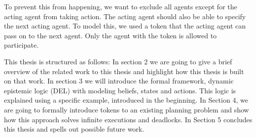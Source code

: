 To prevent this from happening, we want to exclude all agents except for the acting agent from taking action. The acting agent should also be able to specify the next acting agent. To model this, we used a token that the acting agent can pass on to the next agent. Only the agent with the token is allowed to participate.






This thesis is structured as follows:
In section 2 we are going to give a brief overview of the related work to this thesis and highlight how this thesis is built on that work. In section 3 we will introduce the formal framework, dynamic epistemic logic (DEL) with modeling beliefs, states and actions. This logic is explained using a specific example, introduced in the beginning. In Section 4, we are going to formally introduce tokens to an existing planning problem and show how this approach solves infinite executions and deadlocks. In Section 5 concludes this thesis and spells out possible future work.
